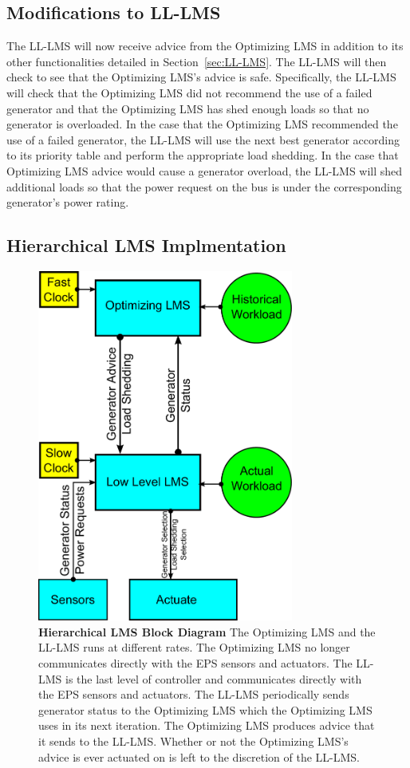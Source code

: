 \documentclass{acm_proc_article-sp}
\begin{document}
\subsection{Modifications to LL-LMS}
The LL-LMS will now receive advice from the Optimizing LMS in addition to its other functionalities detailed in Section~\ref{sec:LL-LMS}. The LL-LMS will then
check to see that the Optimizing LMS's advice is safe. Specifically, the LL-LMS will check that the Optimizing LMS did not recommend the use of a failed generator and that
the Optimizing LMS has shed enough loads so that no generator is overloaded. In the case that the Optimizing LMS recommended the use of a failed generator, the LL-LMS
will use the next best generator according to its priority table and perform the appropriate load shedding. In the case that Optimizing LMS advice would cause a
generator overload, the LL-LMS will shed additional loads so that the power request on the bus is under the corresponding generator's power rating.

\subsection{Hierarchical LMS Implmentation}

\begin{figure}[hp]
  \centering
  \includegraphics[width=0.75\textwidth]{figures/H-LMS.pdf}
  \caption{\textbf{Hierarchical LMS Block Diagram} The Optimizing LMS and the LL-LMS runs at different rates. The Optimizing LMS no longer communicates directly with the EPS sensors
and actuators. The LL-LMS is the last level of controller and communicates directly with the EPS sensors and actuators. The LL-LMS periodically sends
generator status to the Optimizing LMS which the Optimizing LMS uses in its next iteration. The Optimizing LMS produces advice that it sends to the LL-LMS. Whether or not the Optimizing LMS's
advice is ever actuated on is left to the discretion of the LL-LMS.}
  \label{fig:H-LMS}
\end{figure}
\end{document}
